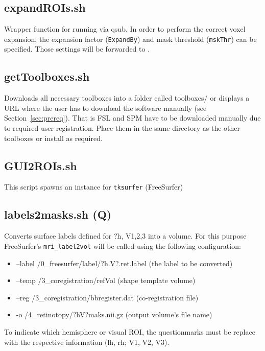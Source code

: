 \documentclass[12pt,a4paper]{scrartcl}
\begin{document}
\subsection{expandROIs.sh}
\label{sh:expROI}
Wrapper function for running \texttt{} via qsub. In order to perform the correct voxel expansion, the expansion factor (\texttt{ExpandBy}) and mask threshold (\texttt{mskThr}) can be specified. Those settings will be forwarded to \texttt{}.\\

\subsection{getToolboxes.sh}
\label{sh:getTools}
Downloads all necessary toolboxes into a folder called toolboxes/ or displays a URL where the user has to download the software manually (see Section~\ref{sec:prereq}). That is FSL and SPM have to be downloaded manually due to required user registration. Place them in the same directory as the other toolboxes or install as required.\\

\subsection{GUI2ROIs.sh}
\label{sh:GUI2ROI}
This script spawns an instance for \texttt{tksurfer} (FreeSurfer)\\

\subsection{labels2masks.sh (Q)}
\label{sh:lbl2msk}
Converts surface labels defined for ?h, V1,2,3 into a volume. For this purpose FreeSurfer's \texttt{mri\_label2vol} will be called using the following configuration:
\begin{itemize}
  \item --label /0\_freesurfer/label/?h.V?.ret.label (the label to be converted)
  \item --temp /3\_coregistration/refVol (shape template volume)
  \item --reg /3\_coregistration/bbregister.dat (co-registration file)
  \item -o /4\_retinotopy/?hV?maks.nii.gz (output volume's file name)
\end{itemize}

To indicate which hemisphere or visual ROI, the questionmarks must be replace with the respective information (lh, rh; V1, V2, V3).\\
\end{document}
